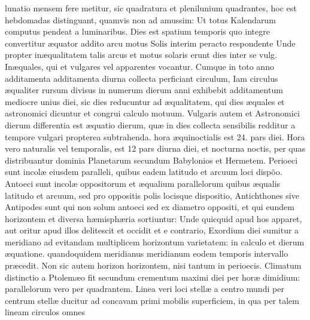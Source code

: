 \documentclass[11pt,a4paper]{article}
\begin{document}
lunatio mensem fere metitur, sic quadratura et plenilunium quadrantes, hoc est hebdomadas distinguant, quamvis non ad amussim: Ut totus Kalendarum computus pendeat a luminaribus. Dies est spatium temporis quo integre convertitur æquator addito arcu motus Solis interim peracto respondente Unde propter inæqualitatem talis arcus et motus solaris erunt dies inter se vulg. Inæquales, qui et vulgares vel apparentes vocantur. Cumque in toto anno additamenta additamenta diurna collecta perficiant circulum, Iam circulus æqualiter rursum divisus in numerum dierum anni exhibebit additamentum mediocre unius diei, sic dies reducuntur ad æqualitatem, qui dies æquales et astronomici dicuntur et congrui calculo motuum.
Vulgaris autem et Astronomici dierum differentia est æquatio dierum, quæ in dies collecta sensibilis redditur a tempore vulgari propterea subtrahenda. hora æquinoctialis est 24. pars diei. Hora vero naturalis vel temporalis, est 12 pars diurna diei, et nocturna noctis, per quas distribuantur dominia Planetarum secundum Babylonios et Hermetem. Perioeci sunt incolæ eiusdem paralleli, quibus eadem latitudo et arcuum loci dispõo.
Antoeci sunt incolæ oppositorum et æqualium parallelorum quibus æqualis latitudo et arcuum, sed pro oppositis polis locisque dispositio, Antichthones sive Antipodes sunt qui non solum antoeci sed ex diametro  oppositi, et qui eundem horizontem et diversa hæmisphæria sortiuntur: Unde quicquid apud hos apparet, aut oritur apud illos delitescit et occidit et e contrario, Exordium diei sumitur a meridiano ad evitandam multiplicem horizontum varietatem: in calculo et dierum æquatione. quandoquidem meridianus meridianum eodem temporis intervallo præcedit. Non sic autem horizon horizontem, nisi tantum in perioecis. Climatum distinctio a Ptolemæo fit secundum crementum maximi diei per horæ dimidium: parallelorum vero per quadrantem. Linea veri loci stellæ a centro mundi per centrum stellæ ducitur ad concavam  primi mobilis superficiem, in qua per talem lineam circulos omnes
\end{document}
